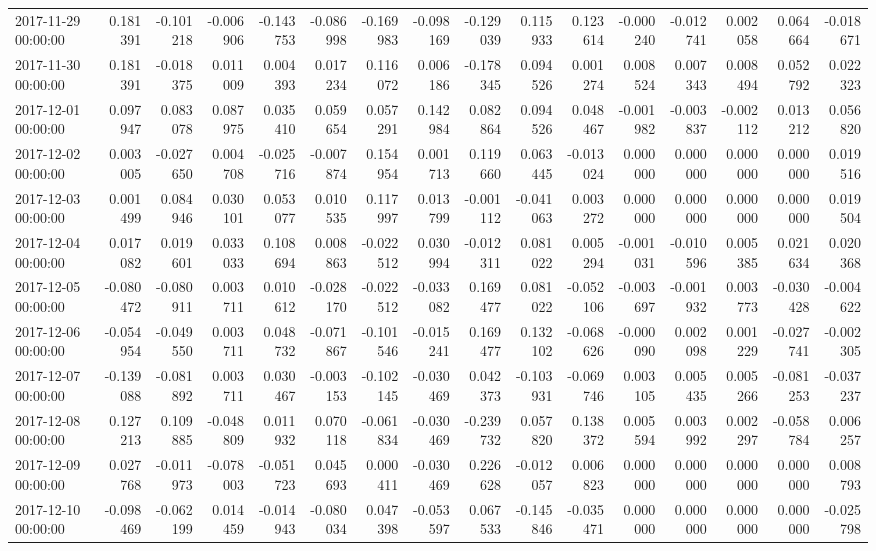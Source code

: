 \begin{tabular}{lrrrrrrrrrrrrrrr}
2017-11-29 00:00:00 & 0.181391 & -0.101218 & -0.006906 & -0.143753 & -0.086998 & -0.169983 & -0.098169 & -0.129039 & 0.115933 & 0.123614 & -0.000240 & -0.012741 & 0.002058 & 0.064664 & -0.018671 \\
2017-11-30 00:00:00 & 0.181391 & -0.018375 & 0.011009 & 0.004393 & 0.017234 & 0.116072 & 0.006186 & -0.178345 & 0.094526 & 0.001274 & 0.008524 & 0.007343 & 0.008494 & 0.052792 & 0.022323 \\
2017-12-01 00:00:00 & 0.097947 & 0.083078 & 0.087975 & 0.035410 & 0.059654 & 0.057291 & 0.142984 & 0.082864 & 0.094526 & 0.048467 & -0.001982 & -0.003837 & -0.002112 & 0.013212 & 0.056820 \\
2017-12-02 00:00:00 & 0.003005 & -0.027650 & 0.004708 & -0.025716 & -0.007874 & 0.154954 & 0.001713 & 0.119660 & 0.063445 & -0.013024 & 0.000000 & 0.000000 & 0.000000 & 0.000000 & 0.019516 \\
2017-12-03 00:00:00 & 0.001499 & 0.084946 & 0.030101 & 0.053077 & 0.010535 & 0.117997 & 0.013799 & -0.001112 & -0.041063 & 0.003272 & 0.000000 & 0.000000 & 0.000000 & 0.000000 & 0.019504 \\
2017-12-04 00:00:00 & 0.017082 & 0.019601 & 0.033033 & 0.108694 & 0.008863 & -0.022512 & 0.030994 & -0.012311 & 0.081022 & 0.005294 & -0.001031 & -0.010596 & 0.005385 & 0.021634 & 0.020368 \\
2017-12-05 00:00:00 & -0.080472 & -0.080911 & 0.003711 & 0.010612 & -0.028170 & -0.022512 & -0.033082 & 0.169477 & 0.081022 & -0.052106 & -0.003697 & -0.001932 & 0.003773 & -0.030428 & -0.004622 \\
2017-12-06 00:00:00 & -0.054954 & -0.049550 & 0.003711 & 0.048732 & -0.071867 & -0.101546 & -0.015241 & 0.169477 & 0.132102 & -0.068626 & -0.000090 & 0.002098 & 0.001229 & -0.027741 & -0.002305 \\
2017-12-07 00:00:00 & -0.139088 & -0.081892 & 0.003711 & 0.030467 & -0.003153 & -0.102145 & -0.030469 & 0.042373 & -0.103931 & -0.069746 & 0.003105 & 0.005435 & 0.005266 & -0.081253 & -0.037237 \\
2017-12-08 00:00:00 & 0.127213 & 0.109885 & -0.048809 & 0.011932 & 0.070118 & -0.061834 & -0.030469 & -0.239732 & 0.057820 & 0.138372 & 0.005594 & 0.003992 & 0.002297 & -0.058784 & 0.006257 \\
2017-12-09 00:00:00 & 0.027768 & -0.011973 & -0.078003 & -0.051723 & 0.045693 & 0.000411 & -0.030469 & 0.226628 & -0.012057 & 0.006823 & 0.000000 & 0.000000 & 0.000000 & 0.000000 & 0.008793 \\
2017-12-10 00:00:00 & -0.098469 & -0.062199 & 0.014459 & -0.014943 & -0.080034 & 0.047398 & -0.053597 & 0.067533 & -0.145846 & -0.035471 & 0.000000 & 0.000000 & 0.000000 & 0.000000 & -0.025798 \\

\end{tabular}
